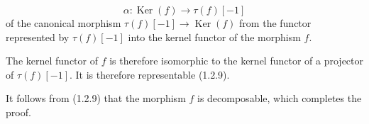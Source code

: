 \[
  \alpha\colon \operatorname{Ker}(f)\longrightarrow \tau(f)[-1]
\]
\noindent of the canonical morphism
$\tau(f)[-1]\longrightarrow\operatorname{Ker}(f)$ from the functor
represented by $\tau(f)[-1]$ into the kernel functor of the morphism $f$.

The kernel functor of $f$ is therefore isomorphic to the kernel functor of
a projector of $\tau(f)[-1]$. It is therefore representable (1.2.9).

It follows from (1.2.9) that the morphism $f$ is decomposable, which
completes the proof.
\endgroup
